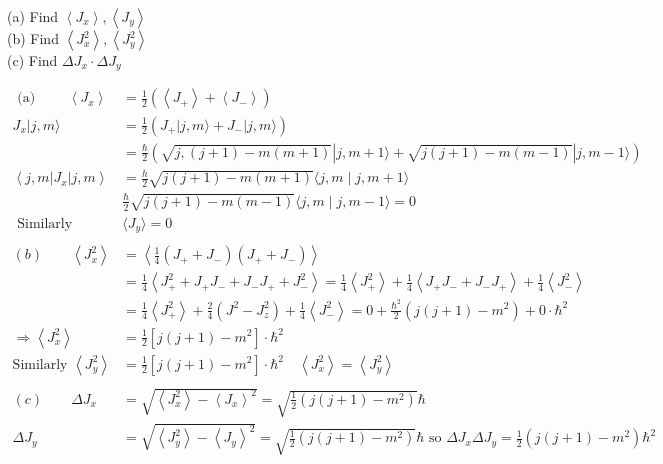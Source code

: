\begin{exercise}
 (a) Find $\left\langle J_{x}\right\rangle,\left\langle J_{y}\right\rangle$\\
	(b) Find $\left\langle J_{x}^{2}\right\rangle,\left\langle J_{y}^{2}\right\rangle$\\
	(c) Find $\Delta J_{x} \cdot \Delta J_{y}$
\end{exercise}
\begin{answer}
	\begin{align*}
		\text { (a) }\qquad\left\langle J_{x}\right\rangle&=\frac{1}{2}\left(\left\langle J_{+}\right\rangle+\left\langle J_{-}\right\rangle\right) \\
		J_{x}|j, m\rangle &=\frac{1}{2}\left(J_{+}|j, m\rangle+J_{-}|j, m\rangle\right) \\
		&=\frac{\hbar}{2}(\sqrt{j,(j+1)-m(m+1)}|j, m+1\rangle+\sqrt{j(j+1)-m(m-1)}|j, m-1\rangle)\\
		\left\langle j, m\left|J_{x}\right| j, m\right\rangle&=\frac{h}{2} \sqrt{j(j+1)-m(m+1)}\langle j, m \mid j, m+1\rangle \\
		&\frac{\hbar}{2} \sqrt{j(j+1)-m(m-1)}\langle j, m \mid j, m-1\rangle=0\\
		\text { Similarly }&\langle J_{y}\rangle=0\\\\
			(b)	\qquad\left\langle J_{x}^{2}\right\rangle &=\left\langle\frac{1}{4}\left(J_{+}+J_{-}\right)\left(J_{+}+J_{-}\right)\right\rangle \\
		&=\frac{1}{4}\left\langle J_{+}^{2}+J_{+} J_{-}+J_{-} J_{+}+J_{-}^{2}\right\rangle=\frac{1}{4}\left\langle J_{+}^{2}\right\rangle+\frac{1}{4}\left\langle J_{+} J_{-}+J_{-} J_{+}\right\rangle+\frac{1}{4}\left\langle J_{-}^{2}\right\rangle \\
		&=\frac{1}{4}\left\langle J_{+}^{2}\right\rangle+\frac{2}{4}\left(J^{2}-J_{z}^{2}\right)+\frac{1}{4}\left\langle J_{-}^{2}\right\rangle=0+\frac{\hbar^{2}}{2}\left(j(j+1)-m^{2}\right)+0 \cdot \hbar^{2}\\
		\Rightarrow\left\langle J_{x}^{2}\right\rangle&=\frac{1}{2}\left[j(j+1)-m^{2}\right] \cdot \hbar^{2}\\
		\text{Similarly }\left\langle J_{y}^{2}\right\rangle&=\frac{1}{2}\left[j(j+1)-m^{2}\right] \cdot \hbar^{2} \quad\left\langle J_{x}^{2}\right\rangle=\left\langle J_{y}^{2}\right\rangle\\\\
			(c) \qquad \Delta J_{x}&=\sqrt{\left\langle J_{x}^{2}\right\rangle-\left\langle J_{x}\right\rangle^{2}}=\sqrt{\frac{1}{2}\left(j(j+1)-m^{2}\right)} \hbar\\
		\Delta J_{y}&=\sqrt{\left\langle J_{y}^{2}\right\rangle-\left\langle J_{y}\right\rangle^{2}}=\sqrt{\frac{1}{2}\left(j(j+1)-m^{2}\right)} \hbar \text { so } \Delta J_{x} \Delta J_{y}=\frac{1}{2}\left(j(j+1)-m^{2}\right) \hbar^{2}
\end{align*}
\end{answer}
